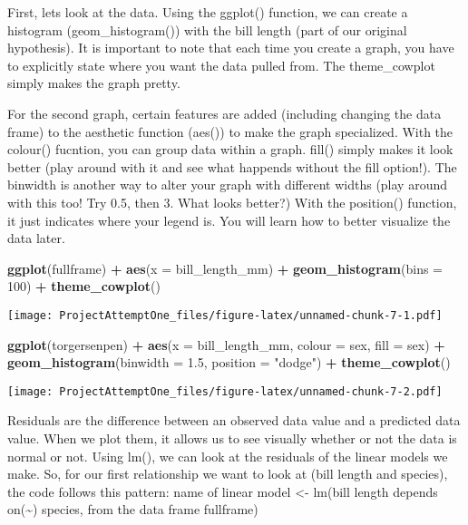 \documentclass[
]{article}
\newenvironment{Shaded}{\begin{snugshade}}{\end{snugshade}}
\newcommand{\AttributeTok}[1]{\textcolor[rgb]{0.13,0.29,0.53}{#1}}
\newcommand{\DecValTok}[1]{\textcolor[rgb]{0.00,0.00,0.81}{#1}}
\newcommand{\FloatTok}[1]{\textcolor[rgb]{0.00,0.00,0.81}{#1}}
\newcommand{\FunctionTok}[1]{\textcolor[rgb]{0.13,0.29,0.53}{\textbf{#1}}}
\newcommand{\NormalTok}[1]{#1}
\newcommand{\SpecialCharTok}[1]{\textcolor[rgb]{0.81,0.36,0.00}{\textbf{#1}}}
\newcommand{\StringTok}[1]{\textcolor[rgb]{0.31,0.60,0.02}{#1}}
\begin{document}
First, lets look at the data. Using the ggplot() function, we can create
a histogram (geom\_histogram()) with the bill length (part of our
original hypothesis). It is important to note that each time you create
a graph, you have to explicitly state where you want the data pulled
from. The theme\_cowplot simply makes the graph pretty.

For the second graph, certain features are added (including changing the
data frame) to the aesthetic function (aes()) to make the graph
specialized. With the colour() fucntion, you can group data within a
graph. fill() simply makes it look better (play around with it and see
what happends without the fill option!). The binwidth is another way to
alter your graph with different widths (play around with this too! Try
0.5, then 3. What looks better?) With the position() function, it just
indicates where your legend is. You will learn how to better visualize
the data later.

\begin{Shaded}
\begin{Highlighting}[]
\FunctionTok{ggplot}\NormalTok{(fullframe) }\SpecialCharTok{+}
  \FunctionTok{aes}\NormalTok{(}\AttributeTok{x =}\NormalTok{ bill\_length\_mm) }\SpecialCharTok{+}
  \FunctionTok{geom\_histogram}\NormalTok{(}\AttributeTok{bins =} \DecValTok{100}\NormalTok{) }\SpecialCharTok{+}
  \FunctionTok{theme\_cowplot}\NormalTok{()}
\end{Highlighting}
\end{Shaded}

\texttt{[image: ProjectAttemptOne\_files/figure-latex/unnamed-chunk-7-1.pdf]}

\begin{Shaded}
\begin{Highlighting}[]
\FunctionTok{ggplot}\NormalTok{(torgersenpen) }\SpecialCharTok{+}
  \FunctionTok{aes}\NormalTok{(}\AttributeTok{x =}\NormalTok{ bill\_length\_mm, }\AttributeTok{colour =}\NormalTok{ sex, }\AttributeTok{fill =}\NormalTok{ sex) }\SpecialCharTok{+}
  \FunctionTok{geom\_histogram}\NormalTok{(}\AttributeTok{binwidth =} \FloatTok{1.5}\NormalTok{,  }\AttributeTok{position =} \StringTok{"dodge"}\NormalTok{) }\SpecialCharTok{+}
  \FunctionTok{theme\_cowplot}\NormalTok{()}
\end{Highlighting}
\end{Shaded}

\texttt{[image: ProjectAttemptOne\_files/figure-latex/unnamed-chunk-7-2.pdf]}

Residuals are the difference between an observed data value and a
predicted data value. When we plot them, it allows us to see visually
whether or not the data is normal or not. Using lm(), we can look at the
residuals of the linear models we make. So, for our first relationship
we want to look at (bill length and species), the code follows this
pattern: name of linear model \textless- lm(bill length depends
on(\textasciitilde) species, from the data frame fullframe)
\end{document}
